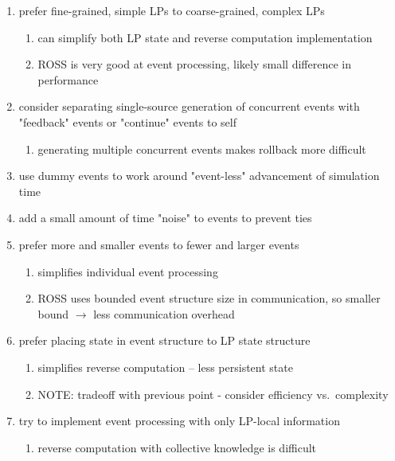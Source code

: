 \documentclass[conference,10pt,compsocconf,onecolumn]{IEEEtran}
\begin{document}
\begin{enumerate}

    \item prefer fine-grained, simple LPs to coarse-grained, complex LPs
    \begin{enumerate}
        \item can simplify both LP state and reverse computation implementation
        \item ROSS is very good at event processing, likely small difference in
            performance
    \end{enumerate}

    \item consider separating single-source generation of concurrent events with
        "feedback" events or "continue" events to self
    \begin{enumerate}
        \item generating multiple concurrent events makes rollback more difficult
    \end{enumerate}

    \item use dummy events to work around "event-less" advancement of simulation time

    \item add a small amount of time "noise" to events to prevent ties

    \item prefer more and smaller events to fewer and larger events
    \begin{enumerate}
        \item simplifies individual event processing
        \item ROSS uses bounded event structure size in communication, so
            smaller bound $\rightarrow$  less communication overhead
    \end{enumerate}

    \item prefer placing state in event structure to LP state structure
    \begin{enumerate}
        \item simplifies reverse computation -- less persistent state
        \item NOTE: tradeoff with previous point - consider efficiency vs.\
            complexity
    \end{enumerate}

    \item try to implement event processing with only LP-local information
    \begin{enumerate}
        \item reverse computation with collective knowledge is difficult
    \end{enumerate}


\end{enumerate}
\end{document}
